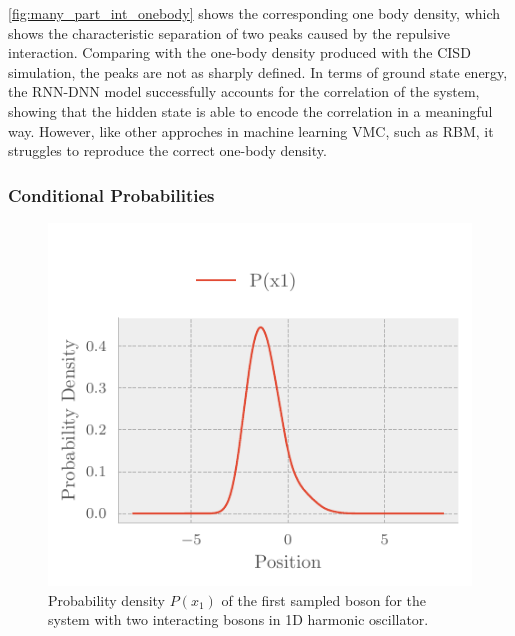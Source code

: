 \autoref{fig:many_part_int_onebody} shows the corresponding one body density,
which shows the characteristic separation of two peaks caused by the repulsive
interaction. Comparing with the one-body density produced with the CISD
simulation, the peaks are not as sharply defined. In terms of ground state
energy, the RNN-DNN model successfully accounts for the correlation of the
system, showing that the hidden state is able to encode the correlation in a
meaningful way. However, like other approches in machine learning VMC, such as
RBM, it struggles to reproduce the correct one-body density.  

\subsubsection{Conditional Probabilities}

\begin{figure}[H]
	\includegraphics[]{figures/many_part_con1.pdf}
	\caption{Probability density $P(x_1)$ of the first sampled boson for the system with two interacting bosons in 1D harmonic oscillator.} 
	\label{fig:many_part_con1}
\end{figure}

